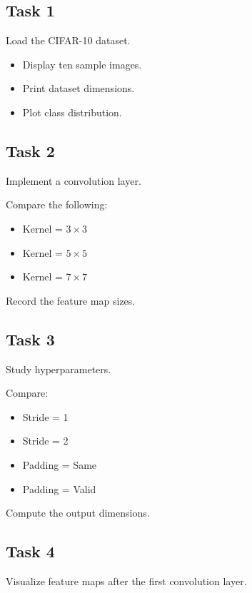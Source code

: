 \documentclass[12pt,a4paper]{article}
\begin{document}
\subsection*{Task 1}

Load the CIFAR-10 dataset.

\begin{itemize}
    \item Display ten sample images.
    \item Print dataset dimensions.
    \item Plot class distribution.
\end{itemize}

\subsection*{Task 2}

Implement a convolution layer.

Compare the following:

\begin{itemize}
    \item Kernel = \(3 \times 3\)
    \item Kernel = \(5 \times 5\)
    \item Kernel = \(7 \times 7\)
\end{itemize}

Record the feature map sizes.

\subsection*{Task 3}

Study hyperparameters.

Compare:

\begin{itemize}
    \item Stride = 1
    \item Stride = 2
    \item Padding = Same
    \item Padding = Valid
\end{itemize}

Compute the output dimensions.

\subsection*{Task 4}

Visualize feature maps after the first convolution layer.
\end{document}
